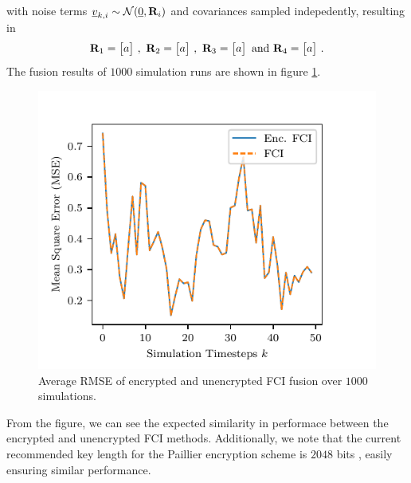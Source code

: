 \documentclass[letterpaper, 10 pt, conference]{ieeeconf}
\begin{document}
with noise terms ${\underline{v}}_{k,i} \sim \mathcal{N}({\underline{0}}, {{\mathbf{R}}}_i)$ and covariances sampled indepedently, resulting in
\begin{equation}
    \mat{R}_1 = 
    \begin{bmatrix}
        a
    \end{bmatrix}\,,\ 
    \mat{R}_2 = 
    \begin{bmatrix}
        a
    \end{bmatrix}\,,\ 
    \mat{R}_3 = 
    \begin{bmatrix}
        a
    \end{bmatrix}\text{ and }
    \mat{R}_4 = 
    \begin{bmatrix}
        a
    \end{bmatrix}\,.
\end{equation}
The fusion results of $1000$ simulation runs are shown in figure \ref{fig:sim_error_plot}. 
\begin{figure}[htbp]
    \centering
    \includegraphics{figures/sim_error_plot.pdf}
    \caption{Average RMSE of encrypted and unencrypted FCI fusion over $1000$ simulations.}
    \label{fig:sim_error_plot}
\end{figure}
From the figure, we can see the expected similarity in performace between the encrypted and unencrypted FCI methods. Additionally, we note that the current recommended key length for the Paillier encryption scheme is $2048$ bits \cite{barkerRecommendationPairWiseKey2019}, easily ensuring similar performance.
\end{document}
